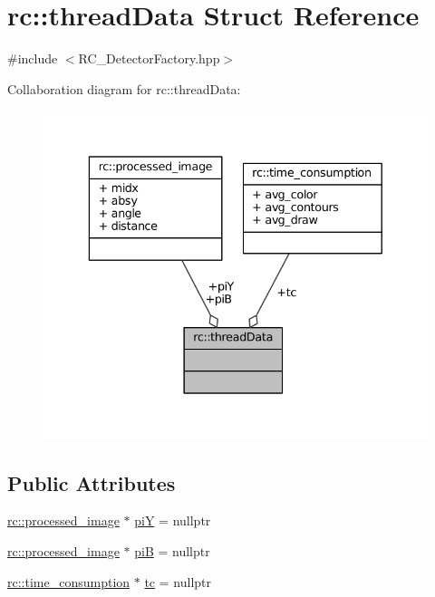 \hypertarget{structrc_1_1threadData}{\section{rc\+:\+:thread\+Data Struct Reference}
\label{structrc_1_1threadData}
}


{\ttfamily \#include $<$R\+C\+\_\+\+Detector\+Factory.\+hpp$>$}



Collaboration diagram for rc\+:\+:thread\+Data\+:\nopagebreak
\begin{figure}[H]
\begin{center}
\leavevmode
\includegraphics[width=336pt]{structrc_1_1threadData__coll__graph}
\end{center}
\end{figure}
\subsection*{Public Attributes}
\begin{DoxyCompactItemize}
\item 
\hyperlink{structrc_1_1processed__image}{rc\+::processed\+\_\+image} $\ast$ \hyperlink{structrc_1_1threadData_ae2a160f5aad8948d708241ba66202608}{pi\+Y} = nullptr
\item 
\hyperlink{structrc_1_1processed__image}{rc\+::processed\+\_\+image} $\ast$ \hyperlink{structrc_1_1threadData_a4b48cf230bc69addbccefa286ed602bc}{pi\+B} = nullptr
\item 
\hyperlink{structrc_1_1time__consumption}{rc\+::time\+\_\+consumption} $\ast$ \hyperlink{structrc_1_1threadData_a756f72bb5d718eb389829cb6a72cf575}{tc} = nullptr
\end{DoxyCompactItemize}


